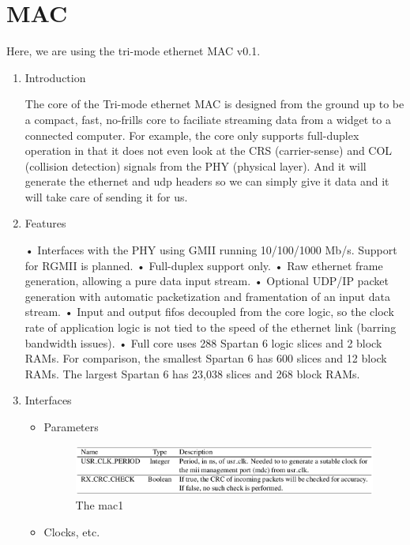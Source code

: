 \chapter{MAC}

Here, we are using the tri-mode ethernet MAC v0.1.

\begin{enumerate}
\item Introduction

The core of the Tri-mode ethernet MAC is designed from the ground up to be a compact, fast, no-frills core to faciliate streaming data from a widget to a connected computer. For example, the core only supports full-duplex operation in that it does not even look at the CRS (carrier-sense) and COL (collision detection) signals from the PHY (physical layer). And it will generate the ethernet and udp headers so we can simply give it data and it will take care of sending it for us.

\item Features

• Interfaces with the PHY using GMII running 10/100/1000 Mb/s. Support for RGMII is planned.
• Full-duplex support only.
• Raw ethernet frame generation, allowing a pure data input stream.
• Optional UDP/IP packet generation with automatic packetization and framentation of an input data
stream.
• Input and output fifos decoupled from the core logic, so the clock rate of application logic is not tied
to the speed of the ethernet link (barring bandwidth issues).
• Full core uses 288 Spartan 6 logic slices and 2 block RAMs. For comparison, the smallest Spartan 6
has 600 slices and 12 block RAMs. The largest Spartan 6 has 23,038 slices and 268 block RAMs.

\item Interfaces

\begin{itemize}

\item Parameters

\begin{figure}[ht!]
\centering
\includegraphics[scale=0.25]{eps/mac1.eps}
\caption{The mac1}
\label{mac1}
\end{figure}

\item Clocks, etc.


\end{itemize}
\end{enumerate}
